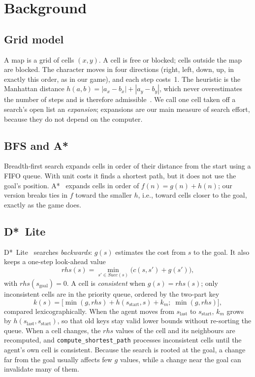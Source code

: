 \documentclass[conference,12pt]{IEEEtran}
\newcommand{\dstar}{D*~Lite}
\begin{document}
\section{Background}
\label{sec:background}

\subsection{Grid model}
A map is a grid of cells $(x,y)$. A cell is free or blocked; cells outside the map are blocked.
The character moves in four directions (right, left, down, up, in exactly this order, as in our
game), and each step costs~1. The heuristic is the Manhattan distance
$h(a,b)=|a_x-b_x|+|a_y-b_y|$, which never overestimates the number of steps and is therefore
admissible~\cite{russell2020aima}. We call one cell taken off a search's open list an
\emph{expansion}; expansions are our main measure of search effort, because they do not depend
on the computer.

\subsection{BFS and A*}
Breadth-first search expands cells in order of their distance from the start using a FIFO
queue. With unit costs it finds a shortest path, but it does not use the goal's position.
A*~\cite{hart1968astar} expands cells in order of $f(n)=g(n)+h(n)$; our version breaks ties in
$f$ toward the smaller $h$, i.e., toward cells closer to the goal, exactly as the game does.

\subsection{\dstar{}}
\dstar{}~\cite{koenig2002dstarlite} searches \emph{backwards}: $g(s)$ estimates the cost from
$s$ to the goal. It also keeps a one-step look-ahead value
\begin{equation}
\mathit{rhs}(s)=\min_{s'\in \mathit{Succ}(s)}\bigl(c(s,s')+g(s')\bigr),
\end{equation}
with $\mathit{rhs}(s_{\text{goal}})=0$.
A cell is \emph{consistent} when $g(s)=\mathit{rhs}(s)$; only inconsistent cells are in the
priority queue, ordered by the two-part key
\begin{equation}
k(s)=\bigl[\min(g,\mathit{rhs})+h(s_{\text{start}},s)+k_m;\;\min(g,\mathit{rhs})\bigr],
\end{equation}
compared lexicographically. When the agent moves from $s_{\text{last}}$ to $s_{\text{start}}$,
$k_m$ grows by $h(s_{\text{last}},s_{\text{start}})$, so that old keys stay valid lower bounds
without re-sorting the queue. When a cell changes, the $\mathit{rhs}$ values of the cell and its
neighbours are recomputed, and \texttt{compute\_shortest\_path} processes inconsistent cells
until the agent's own cell is consistent. Because the search is rooted at the goal, a change
far from the goal usually affects few $g$ values, while a change near the goal can invalidate
many of them.
\end{document}
